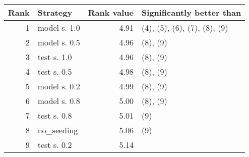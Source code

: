 \begin{tabular}{r l r l}
\textbf{Rank} & \textbf{Strategy} & \textbf{Rank value} & \textbf{Significantly better than} \\
\hline
1 & model s. 1.0    & 4.91  & (4), (5), (6), (7), (8), (9) \\
2 & model s. 0.5   & 4.96 & (8), (9) \\
3 & test s. 1.0       & 4.96  & (8), (9) \\
4 &  test s. 0.5     & 4.98  & (8), (9) \\
5 & model s. 0.2  & 4.99  & (8), (9) \\
6 & model s. 0.8  & 5.00  & (8), (9) \\
7 & test s. 0.8      & 5.01   & (9) \\
8 & no\_seeding  & 5.06   & (9) \\
9 & test s. 0.2     & 5.14    &    \\
\end{tabular}